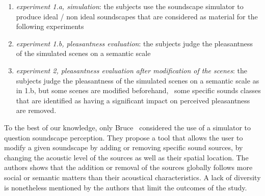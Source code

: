 \documentclass[twoside,twocolumn]{article}
\begin{document}
\begin{enumerate}
\item \emph{experiment 1.a, simulation}:  the subjects use the soundscape simulator to produce ideal / non ideal soundscapes that are considered as material for the following experiments
\item \emph{experiment 1.b, pleasantness evaluation}: the subjects judge the pleasantness of the simulated scenes on a semantic scale
\item \emph{experiment 2, pleasantness evaluation after modification of the scenes}: the subjects judge the pleasantness of the simulated scenes on a semantic scale as in 1.b, but some scenes are modified beforehand, \ie~some specific sounds classes that are identified as having a significant impact on perceived pleasantness are removed.
\end{enumerate}


To the best of our knowledge, only Bruce~\al \cite{bruce2009development,bruce2014effects} considered the use of a simulator to question soundscape perception. They propose a tool that allows the user to modify a given soundscape by adding or removing specific sound sources, by changing the acoustic level of the sources as well as their spatial location. The authors shows that the addition or removal of the sources globally follows more social or semantic matters than their acoustical characteristics. A lack of diversity is nonetheless mentioned by the authors that limit the outcomes of the study.

\end{document}
